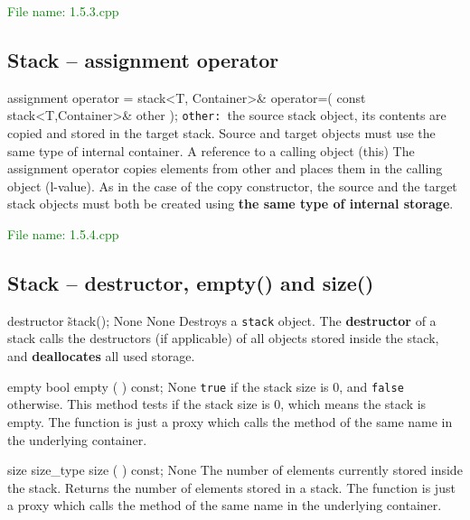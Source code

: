\textcolor{green}{File name: 1.5.3.cpp}


\subsection{Stack – assignment operator} %
\begin{methodinfo}
  {assignment operator =}
  {stack<T, Container>& operator=( const stack<T,Container>& other );}
  {\texttt{other: }the source stack object, its contents are copied and stored in the target stack. 
  Source and target objects must use the same type of internal container.}
  {A reference to a calling object (\*this)}
  {The assignment operator copies elements from other and places them in the calling object (l-value). 
  As in the case of the copy constructor, the source and the target stack objects must both be created 
  using \textbf{the same type of internal storage}.}
\end{methodinfo}

\textcolor{green}{File name: 1.5.4.cpp}


\subsection{Stack – destructor, empty() and size()} %
\begin{methodinfo}
  {destructor}
  {\~stack();}
  {None}
  {None}
  {Destroys a \texttt{stack} object. The \textbf{destructor} of a stack calls the destructors (if applicable) 
  of all objects stored inside the stack, and \textbf{deallocates} all used storage.}
\end{methodinfo}
\begin{methodinfo}
  {empty}
  {bool empty ( ) const;}
  {None}
  {\texttt{true} if the stack size is 0, and \texttt{false} otherwise.}
  {This method tests if the stack size is 0, which means the stack is empty. The function is just a proxy 
  which calls the method of the same name in the underlying container.}
\end{methodinfo}
\begin{methodinfo}
  {size}
  {size_type size ( ) const;}
  {None}
  {The number of elements currently stored inside the stack.}
  {Returns the number of elements stored in a stack. The function is just a proxy which calls the method 
  of the same name in the underlying container.}
\end{methodinfo}

